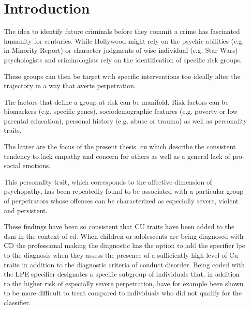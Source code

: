 
\section{Introduction}

The idea to identify future criminals before they commit a crime has fascinated humanity for centuries.
While Hollywood might rely on the psychic abilities (e.g. in Minority Report) or character judgments of wise individual (e.g. Star Wars) psychologists and criminologists rely on the identification of specific risk groups.

These groups can then be target with specific interventions too ideally alter the trajectory in a way that averts perpetration.

The factors that define a group at risk can be manifold.
Risk factors can be biomarkers (e.g. specific genes), sociodemographic features (e.g. poverty or low parental education), personal history
(e.g. abuse or trauma) as well as personality traits.

The latter are the focus of the present thesis. \gls{cu} which describe the consistent tendency to lack empathy and concern for others as well as a general lack of pro-social emotions.

This personality trait, which corresponds to the affective dimension of psychopathy, has been repeatedly found to be associated with a 
particular group of perpetrators whose offenses can be characterized as especially severe, violent and persistent.

These findings have been so consistent that CU traits have been added to the \gls{dsm} in the context of \gls{cd}.
When children or adolescents are being diagnosed with CD the professional making the diagnostic has the option to add the specifier
\gls{lpe} to the diagnosis when they assess the presence of a sufficiently high level of Cu-traits in addition to the diagnostic criteria
of conduct disorder.
Being coded with the LPE specifier designates a specific subgroup of individuals that, in addition to the higher risk of especially severe perpetration,  have for example been shown to be more difficult to treat \parencite{hawes_callous-unemotional_2014} compared to individuals who did not qualify for the classifier.

